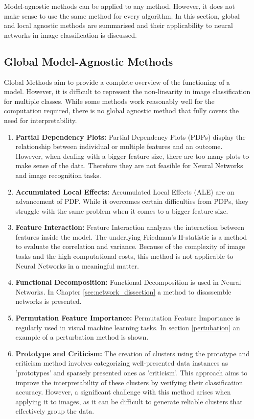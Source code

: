 Model-agnostic methods can be applied to any method. However, it does not make sense to use the same method for every algorithm. In this section, global and local agnostic methods are summarised and their applicability to neural networks in image classification is discussed. 


\subsection{Global Model-Agnostic Methods}

Global Methods aim to provide a complete overview of the functioning of a model. However, it is difficult to represent the non-linearity in image classification for multiple classes. While some methods work reasonably well for the computation required, there is no global agnostic method that fully covers the need for interpretability.

\begin{enumerate}
	\item \textbf{Partial Dependency Plots:} Partial Dependency Plots (PDPs)\cite{PDP} display the relationship between individual or multiple features and an outcome. However, when dealing with a bigger feature size, there are too many plots to make sense of the data. Therefore they are not feasible for Neural Networks and image recognition tasks.
	\item \textbf{Accumulated Local Effects:} Accumulated Local Effects (ALE)\cite{apley2019visualizing} are an advancement of PDP. While it overcomes certain difficulties from PDPs, they struggle with the same problem when it comes to a bigger feature size.
	\item \textbf{Feature Interaction:} Feature Interaction analyzes the interaction between features inside the model. The underlying Friedman's H-statistic\cite{friedman2008predictive} is a method to evaluate the correlation and variance. Because of the complexity of image tasks and the high computational costs, this method is not applicable to Neural Networks in a meaningful matter.
	\item \textbf{Functional Decomposition:} Functional Decomposition is used in Neural Networks. In Chapter \ref{sec:network_dissection} a method to disassemble networks is presented.
	\item \textbf{Permutation Feature Importance:} Permutation Feature Importance is regularly used in visual machine learning tasks. In section \ref{pertubation} an example of a perturbation method is shown.
	\item \textbf{Prototype and Criticism:} The creation of clusters using the prototype and criticism method involves categorizing well-presented data instances as 'prototypes' and sparsely presented ones as 'criticism'. This approach aims to improve the interpretability of these clusters by verifying their classification accuracy. However, a significant challenge with this method arises when applying it to images, as it can be difficult to generate reliable clusters that effectively group the data.
\end{enumerate}



